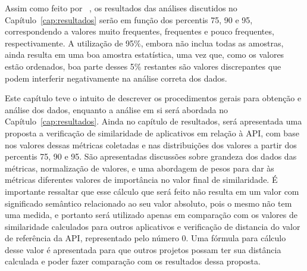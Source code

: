 Assim como feito por ~, os resultados das análises discutidos no Capítulo~\ref{cap:resultados} serão em função dos percentis 75, 90 e 95, correspondendo a valores muito frequentes, frequentes e pouco frequentes, respectivamente. A utilização de 95\%, embora não inclua todas as amostras, ainda resulta em uma boa amostra estatística, uma vez que, como os valores estão ordenados, boa parte desses 5\% restantes são valores discrepantes que podem interferir negativamente na análise correta dos dados.

Este capítulo teve o intuito de descrever os procedimentos gerais para obtenção e análise dos dados, enquanto a análise em si será abordada no Capítulo~\ref{cap:resultados}. Ainda no capítulo de resultados, será apresentada uma proposta a verificação de similaridade de aplicativos em relação à API, com base nos valores dessas métricas coletadas e nas distribuições dos valores a partir dos percentis 75, 90 e 95. São apresentadas discussões sobre grandeza dos dados das métricas, normalização de valores, e uma abordagem de pesos para dar às métricas diferentes valores de importância no valor final de similaridade. É importante ressaltar que esse cálculo que será feito não resulta em um valor com significado semântico relacionado ao seu valor absoluto, pois o mesmo não tem uma medida, e portanto será utilizado apenas em comparação com os valores de similaridade calculados para outros aplicativos e verificação de distancia do valor de referência da API, representado pelo número 0. Uma fórmula para cálculo desse valor é apresentada para que outros projetos possam ter sua distância calculada e poder fazer comparação com os resultados dessa proposta.
